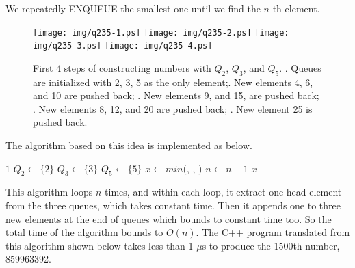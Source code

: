 \documentclass{article}
\begin{document}
We repeatedly ENQUEUE the smallest one until we find the $n$-th element.

\begin{figure}[htbp]
       \begin{center}
       	  \texttt{[image: img/q235-1.ps]}
       	  \texttt{[image: img/q235-2.ps]}
       	  \texttt{[image: img/q235-3.ps]}
       	  \texttt{[image: img/q235-4.ps]}
        \caption{First 4 steps of constructing numbers with $Q_2$, $Q_3$, and $Q_5$. . Queues are initialized with 2, 3, 5 as the only element;. New elements 4, 6, and 10 are pushed back; . New elements 9, and 15, are pushed back; . New elements 8, 12, and 20 are pushed back; . New element 25 is pushed back.} \label{fig:q235}
       \end{center}
\end{figure}

The algorithm based on this idea is implemented as below.

\begin{algorithmic}[1]
    \State \Return $1$
  \Else
    \State $Q_2 \gets \{ 2 \}$
    \State $Q_3 \gets \{ 3 \}$
    \State $Q_5 \gets \{ 5 \}$
      \State $x \gets min($, , $)$
        \State {}
        \State {}
        \State {}
        \State {}
        \State {}
        \State {}
        \State {}
      \Else
        \State {}
        \State {}
      \EndIf
      \State $n \gets n - 1$
    \EndWhile
    \State \Return $x$
  \EndIf
\EndFunction
\end{algorithmic}

This algorithm loops $n$ times, and within each loop, it extract one head
element from the three queues, which takes constant time. Then it appends
one to three new elements at the end of queues which bounds to constant time
too. So the total time of the algorithm bounds to $O(n)$. The C++ program
translated from this algorithm shown below takes less than 1 $\mu$s to
produce the 1500th number, 859963392.
\end{document}
